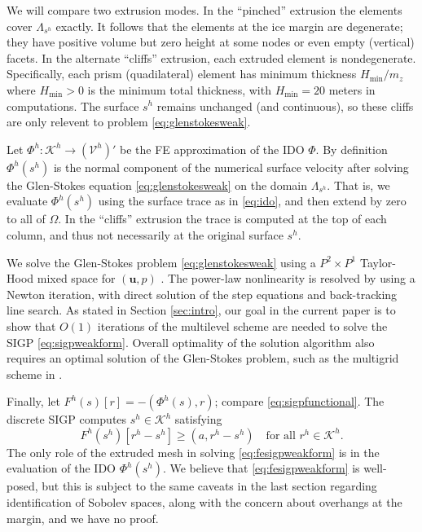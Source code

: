 \documentclass[letterpaper,final,12pt,reqno]{amsart}
\theoremstyle{claim}
\newcommand{\bu}{\mathbf{u}}
\newcommand{\ip}[2]{\left(#1,#2\right)}
\numberwithin{equation}{section}
\numberwithin{figure}{section}
\numberwithin{table}{section}
\numberwithin{theorem}{section}
\begin{document}
We will compare two extrusion modes.  In the ``pinched'' extrusion the elements cover $\Lambda_{s^h}$ exactly.  It follows that the elements at the ice margin are degenerate; they have positive volume but zero height at some nodes or even empty (vertical) facets.  In the alternate ``cliffs'' extrusion, each extruded element is nondegenerate.  Specifically, each prism (quadilateral) element has minimum thickness $H_{\text{min}}/m_z$ where $H_{\text{min}} > 0$ is the minimum total thickness, with $H_{\text{min}} = 20$ meters in computations.  The surface $s^h$ remains unchanged (and continuous), so these cliffs are only relevent to problem \eqref{eq:glenstokesweak}.

Let $\Phi^h:\mathcal{K}^h \to (\mathcal{V}^h)'$ be the FE approximation of the IDO $\Phi$.  By definition $\Phi^h(s^h)$ is the normal component of the numerical surface velocity after solving the Glen-Stokes equation \eqref{eq:glenstokesweak} on the domain $\Lambda_{s^h}$.  That is, we evaluate $\Phi^h(s^h)$ using the surface trace as in \eqref{eq:ido}, and then extend by zero to all of $\Omega$.  In the ``cliffs'' extrusion the trace is computed at the top of each column, and thus not necessarily at the original surface $s^h$.

We solve the Glen-Stokes problem \eqref{eq:glenstokesweak} using a $P^2 \times P^1$ Taylor-Hood mixed space for $(\bu,p)$ \cite{Elmanetal2014}.  The power-law nonlinearity is resolved by using a Newton iteration, with direct solution of the step equations and back-tracking line search.  As stated in Section \ref{sec:intro}, our goal in the current paper is to show that $O(1)$ iterations of the multilevel scheme are needed to solve the SIGP \eqref{eq:sigpweakform}.  Overall optimality of the solution algorithm also requires an optimal solution of the Glen-Stokes problem, such as the multigrid scheme in \cite{IsaacStadlerGhattas2015}.

Finally, let $F^h(s)[r] = - \ip{\Phi^h(s)}{r}$; compare \eqref{eq:sigpfunctional}.  The discrete SIGP computes $s^h \in \mathcal{K}^h$ satisfying
\begin{equation}
F^h(s^h)[r^h - s^h] \ge \ip{a}{r^h-s^h} \quad \text{for all } r^h \in \mathcal{K}^h. \label{eq:fesigpweakform}
\end{equation}
The only role of the extruded mesh in solving \eqref{eq:fesigpweakform} is in the evaluation of the IDO $\Phi^h(s^h)$.  We believe that \eqref{eq:fesigpweakform} is well-posed, but this is subject to the same caveats in the last section regarding identification of Sobolev spaces, along with the concern about overhangs at the margin, and we have no proof.
\end{document}
